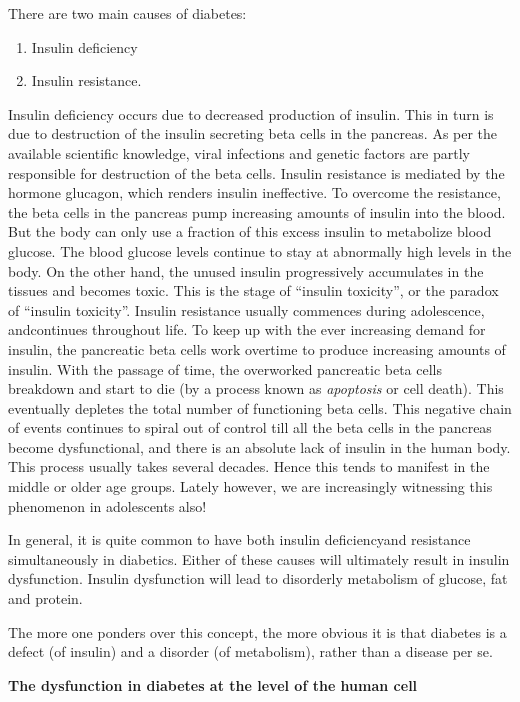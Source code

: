 There are two main causes of diabetes:
\begin{enumerate}
\itemsep=0pt
\item Insulin deficiency
 \item Insulin resistance.
\end{enumerate}

Insulin deficiency occurs due to decreased production of insulin. This in turn is due to destruction of the insulin secreting beta cells in the pancreas. As per the available scientific knowledge, viral infe\-ctions and genetic factors are partly responsible for destruction of the beta cells. Insulin resistance is mediated by the hormone glucagon, which renders insulin ineffective. To overcome the resistance, the beta cells in the pancreas pump increasing amounts of insulin into the blood. But the body can only use a fraction of this excess insulin to meta\-bolize blood glucose. The blood glucose levels continue to stay at abnormally high levels in the body. On the other hand, the unused insu\-lin progressively accumulates in the tissues and becomes toxic. This is the stage of “insulin toxicity”, or the paradox of “insulin toxi\-city”. Insulin resi\-stance usually commences during adolescence, and\break continues throughout life. To keep up with the ever increasing demand for insulin, the pancreatic beta cells work overtime to produce increasing amounts of insulin. With the passage of time, the overworked pancreatic beta cells breakdown and start to die (by a process known as \textit{apoptosis} or cell death). This eventually depletes the total number of functioning beta cells. This negative chain of events conti\-nues to spiral out of control till all the beta cells in the pancreas become dysfunc\-tional, and there is an absolute lack of insulin in the human body. This process usually takes several decades. Hence this tends to manifest in the middle or older age groups. Lately however, we are increasingly witnessing this phenomenon in adolescents also!

In general, it is quite common to have both insulin deficiency\break and resistance simultaneously in diabetics. Either of these causes will ultimately result in insulin dysfunction. Insulin dysfunction will lead to disorderly metabolism of glucose, fat and protein.

The more one ponders over this concept, the more obvious it is that diabetes is a defect (of insulin) and a disorder (of metabolism), rather than a disease per se.

\noindent
\textbf{The dysfunction in diabetes at the level of the human cell}

